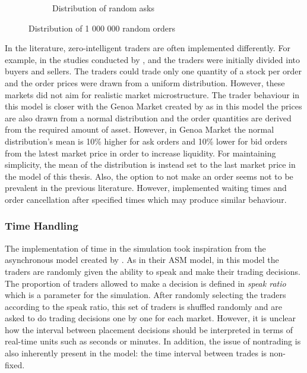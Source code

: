 \begin{figure}[H]
\begin{subfigure}{.5\textwidth}
      \caption{Distribution of random asks}
      \label{fig:gener_asks}
    \end{subfigure}
    \caption{Distribution of 1 000 000 random orders}
    \label{fig:generated_orders}
\end{figure}



In the literature, zero-intelligent traders are often implemented differently. For example, in the studies conducted by 
\citet{God93}, \citet{Jam96} and \citet{Mil08} the traders were initially divided into buyers and 
sellers. The traders could trade only one quantity of a stock per order and the order prices 
were drawn from a uniform distribution. However, these markets did not aim for 
realistic market microstructure. The trader behaviour in this model is closer with the Genoa Market 
created by \citet{Genoa01} as in this model the prices are also drawn from a normal distribution and 
the order quantities are derived from the required amount of asset. However, in Genoa Market the 
normal distribution's mean is 10\% higher for ask orders and 10\% lower for bid orders from the 
latest market price in order to increase liquidity. For maintaining simplicity, the mean of the distribution 
is instead set to the last market price in the model of this thesis. Also, the option to not make an order 
seems not to be prevalent in the previous literature. However, \citet{Raberto05} implemented waiting times and order 
cancellation after specified times which may produce similar behaviour. 

\subsubsection{Time Handling}

The implementation of time in the simulation took inspiration from the asynchronous model created by \citet{Julien07}. 
As in their ASM model, in this model the traders are randomly given the ability to speak and make 
their trading decisions. The proportion of traders allowed to make a decision is defined in
\textit{speak ratio} which is a parameter for the simulation. After randomly selecting the traders
according to the speak ratio, this set of traders is shuffled randomly and are asked to do trading 
decisions one by one for each market. However, it is unclear how the interval between placement 
decisions should be interpreted in terms of real-time units such as seconds or minutes. In addition, 
the issue of nontrading is also inherently present in the model: the time interval between trades 
is non-fixed.

